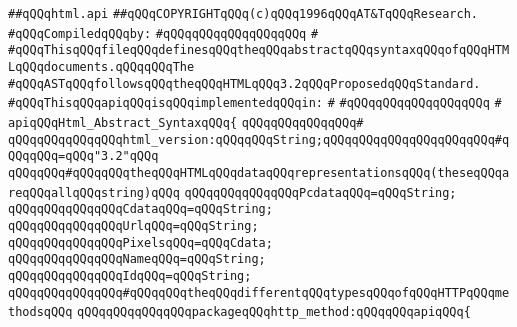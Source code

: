\label{src/lib/html/html-abstract-syntax.api}
\verb|##qQQqhtml.api|\newline
\verb|##qQQqCOPYRIGHTqQQq(c)qQQq1996qQQqAT&TqQQqResearch.|\newline
\newline
\verb|#qQQqCompiledqQQqby:|\newline
\verb|#qQQqqQQqqQQqqQQqqQQq|\newline
\newline
\newline
\verb|#|\newline
\verb|#qQQqThisqQQqfileqQQqdefinesqQQqtheqQQqabstractqQQqsyntaxqQQqofqQQqHTMLqQQqdocuments.qQQqqQQqThe|\newline
\verb|#qQQqASTqQQqfollowsqQQqtheqQQqHTMLqQQq3.2qQQqProposedqQQqStandard.|\newline
\newline
\verb|#qQQqThisqQQqapiqQQqisqQQqimplementedqQQqin:|\newline
\verb|#|\newline
\verb|#qQQqqQQqqQQqqQQqqQQq|\newline
\verb|#|\newline
\verb|apiqQQqHtml_Abstract_SyntaxqQQq{|\newline
\verb|qQQqqQQqqQQqqQQq#|\newline
\verb|qQQqqQQqqQQqqQQqhtml_version:qQQqqQQqString;qQQqqQQqqQQqqQQqqQQqqQQq#qQQqqQQq=qQQq"3.2"qQQq|\newline
\newline
\verb|qQQqqQQq#qQQqqQQqtheqQQqHTMLqQQqdataqQQqrepresentationsqQQq(theseqQQqareqQQqallqQQqstring)qQQq|\newline
\verb|qQQqqQQqqQQqqQQqPcdataqQQq=qQQqString;|\newline
\verb|qQQqqQQqqQQqqQQqCdataqQQq=qQQqString;|\newline
\verb|qQQqqQQqqQQqqQQqUrlqQQq=qQQqString;|\newline
\verb|qQQqqQQqqQQqqQQqPixelsqQQq=qQQqCdata;|\newline
\verb|qQQqqQQqqQQqqQQqNameqQQq=qQQqString;|\newline
\verb|qQQqqQQqqQQqqQQqIdqQQq=qQQqString;|\newline
\newline
\verb|qQQqqQQqqQQqqQQq#qQQqqQQqtheqQQqdifferentqQQqtypesqQQqofqQQqHTTPqQQqmethodsqQQq|\newline
\verb|qQQqqQQqqQQqqQQqpackageqQQqhttp_method:qQQqqQQqapiqQQq{|\newline
